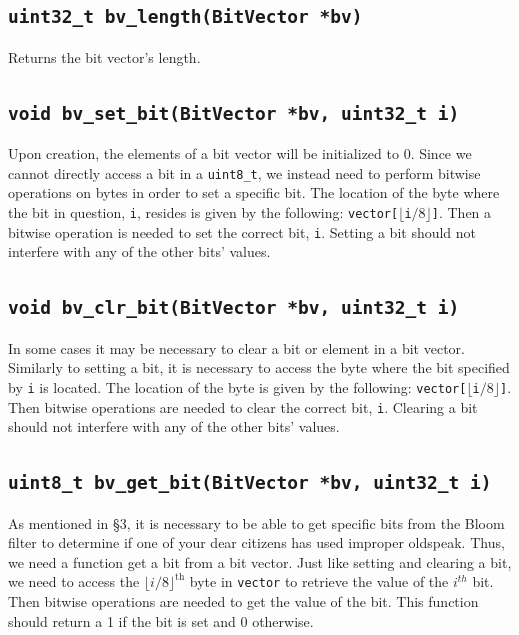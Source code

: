 \documentclass{article}
\begin{document}
\subsection{\texttt{uint32\_t bv\_length(BitVector *bv)}}

Returns the bit vector's length.

\subsection{\texttt{void bv\_set\_bit(BitVector *bv, uint32\_t i)}}

Upon creation, the elements of a bit vector will be initialized to 0.
Since we cannot directly access a bit in a \texttt{uint8\_t}, we instead
need to perform bitwise operations on bytes in order to set a specific
bit. The location of the byte where the bit in question, \texttt{i},
resides is given by the following:
\texttt{vector[$\lfloor$i$/8\rfloor$]}. Then a bitwise operation is
needed to set the correct bit, \texttt{i}. Setting a bit should not
interfere with any of the other bits' values.

\subsection{\texttt{void bv\_clr\_bit(BitVector *bv, uint32\_t i)}}

In some cases it may be necessary to clear a bit or element in a
bit vector. Similarly to setting a bit, it is necessary to access the
byte where the bit specified by \texttt{i} is located. The location of
the byte is given by the following:
\texttt{vector[$\lfloor$i$/8\rfloor$]}.  Then bitwise operations are
needed to clear the correct bit, \texttt{i}.  Clearing a bit should not
interfere with any of the other bits' values.

\subsection{\texttt{uint8\_t bv\_get\_bit(BitVector *bv, uint32\_t i)}}

As mentioned in \S 3, it is necessary to be able to get specific bits
from the Bloom filter to determine if one of your dear citizens has used
improper oldspeak. Thus, we need a function get a bit from a bit
vector.  Just like setting and clearing a bit, we need to access the
$\lfloor i/8 \rfloor^\text{th}$ byte in \texttt{vector} to retrieve the value
of the $i^{th}$ bit. Then bitwise operations are needed to get the value
of the bit. This function should return a 1 if the bit is set and 0
otherwise.
\end{document}
